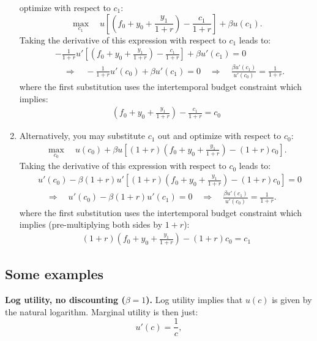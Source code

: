 \documentclass[]{book}
\theoremstyle{definition}
\theoremstyle{definition}
\theoremstyle{definition}
\theoremstyle{remark}
\begin{document}
\begin{enumerate}
  optimize with respect to \(c_{1}\):
  \[\max_{c_{1}}\quad u\left[\left(f_{0}+y_{0}+\frac{y_{1}}{1+r}\right)-\frac{c_{1}}{1+r}\right]+\beta u(c_{1}).\]
  Taking the derivative of this expression with respect to \(c_1\) leads
  to: \[
  \begin{aligned}
  &-\frac{1}{1+r} u'\left[\left(f_{0}+y_{0}+\frac{y_{1}}{1+r}\right)-\frac{c_{1}}{1+r}\right]+\beta u'(c_{1})=0\\
  &\quad\Rightarrow\quad-\frac{1}{1+r}u'(c_{0})+\beta u'(c_{1})=0\quad\Rightarrow\quad\frac{\beta u'(c_{1})}{u'(c_{0})}=\frac{1}{1+r}.
  \end{aligned}
  \] where the first substitution uses the intertemporal budget
  constraint which implies: \[
  \begin{aligned}
  \left(f_{0}+y_{0}+\frac{y_{1}}{1+r}\right)-\frac{c_{1}}{1+r}=c_0
  \end{aligned}
  \]
\item
  Alternatively, you may substitute \(c_{1}\) out and optimize with
  respect to \(c_{0}\): \[
  \begin{aligned}
  \max_{c_{0}}\quad u(c_{0})+\beta u\left[(1+r)\left(f_{0}+y_{0}+\frac{y_{1}}{1+r}\right)-(1+r)c_{0}\right].
  \end{aligned}
  \] Taking the derivative of this expression with respect to \(c_0\)
  leads to: \[
  \begin{aligned}
  &u'(c_{0})-\beta(1+r)u'\left[(1+r)\left(f_{0}+y_{0}+\frac{y_{1}}{1+r}\right)-(1+r)c_{0}\right]=0\\
  &\quad\Rightarrow\quad u'(c_{0})-\beta(1+r)u'(c_{1})=0\quad\Rightarrow\quad\frac{\beta u'(c_{1})}{u'(c_{0})}=\frac{1}{1+r}.
  \end{aligned}
  \] where the first substitution uses the intertemporal budget
  constraint which implies (pre-multiplying both sides by \(1+r\)): \[
  \begin{aligned}
  (1+r)\left(f_{0}+y_{0}+\frac{y_{1}}{1+r}\right)-(1+r)c_{0}=c_1
  \end{aligned}
  \]
\end{enumerate}

\subsection{Some examples}\label{some-examples}

\textbf{Log utility, no discounting (\(\beta = 1\)).} Log utility
implies that \(u(c)\) is given by the natural logarithm. Marginal
utility is then just: \[u'(c)=\frac{1}{c},\]
\end{document}
